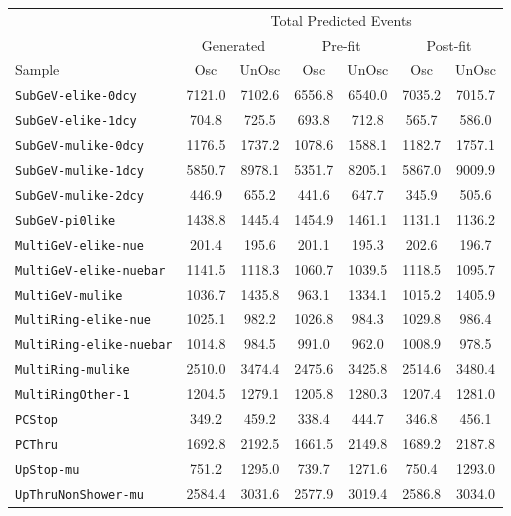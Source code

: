 \begin{table}[ht!]
    \centering
    \begin{tabular}{|l|c|c|c|c|c|c|}
      \hline
      & \multicolumn{6}{|c|}{Total Predicted Events} \\
      \cline{2-7}
      & \multicolumn{2}{|c}{Generated} & \multicolumn{2}{|c}{Pre-fit} & \multicolumn{2}{|c|}{Post-fit} \\
      \cline{2-7}
      Sample & Osc & UnOsc & Osc & UnOsc & Osc & UnOsc \\
      \hline
      \texttt{SubGeV-elike-0dcy} & 7121.0 & 7102.6 & 6556.8 & 6540.0 & 7035.2 & 7015.7 \\
      \texttt{SubGeV-elike-1dcy} & 704.8 & 725.5 & 693.8 & 712.8 & 565.7 & 586.0 \\
      \texttt{SubGeV-mulike-0dcy} & 1176.5 & 1737.2 & 1078.6 & 1588.1 & 1182.7 & 1757.1 \\
      \texttt{SubGeV-mulike-1dcy} & 5850.7 & 8978.1 & 5351.7 & 8205.1 & 5867.0 & 9009.9 \\
      \texttt{SubGeV-mulike-2dcy} & 446.9 & 655.2 & 441.6 & 647.7 & 345.9 & 505.6 \\
      \texttt{SubGeV-pi0like} & 1438.8 & 1445.4 & 1454.9 & 1461.1 & 1131.1 & 1136.2 \\
      \texttt{MultiGeV-elike-nue} & 201.4 & 195.6 & 201.1 & 195.3 & 202.6 & 196.7 \\
      \texttt{MultiGeV-elike-nuebar} & 1141.5 & 1118.3 & 1060.7 & 1039.5 & 1118.5 & 1095.7 \\
      \texttt{MultiGeV-mulike} & 1036.7 & 1435.8 & 963.1 & 1334.1 & 1015.2 & 1405.9 \\
      \texttt{MultiRing-elike-nue} & 1025.1 & 982.2 & 1026.8 & 984.3 & 1029.8 & 986.4 \\
      \texttt{MultiRing-elike-nuebar} & 1014.8 & 984.5 & 991.0 & 962.0 & 1008.9 & 978.5 \\
      \texttt{MultiRing-mulike} & 2510.0 & 3474.4 & 2475.6 & 3425.8 & 2514.6 & 3480.4 \\      
      \texttt{MultiRingOther-1} & 1204.5 & 1279.1 & 1205.8 & 1280.3 & 1207.4 & 1281.0 \\
      \texttt{PCStop} & 349.2 & 459.2 & 338.4 & 444.7 & 346.8 & 456.1 \\
      \texttt{PCThru} & 1692.8 & 2192.5 & 1661.5 & 2149.8 & 1689.2 & 2187.8 \\
      \texttt{UpStop-mu} & 751.2 & 1295.0 & 739.7 & 1271.6 & 750.4 & 1293.0 \\
      \texttt{UpThruNonShower-mu} & 2584.4 & 3031.6 & 2577.9 & 3019.4 & 2586.8 & 3034.0 \\

\end{tabular}
\end{table}
